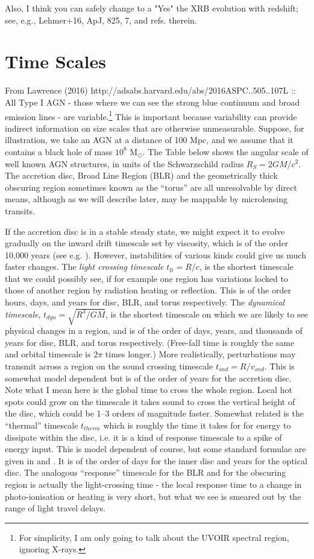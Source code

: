 \documentclass[11pt]{article}
\begin{document}
Also, I think you can safely change to a "Yes" the XRB evolution
with redshift; see, e.g., Lehmer+16, ApJ, 825, 7, and refs. therein.


\newpage
\section{Time Scales}
From Lawrence (2016) http://adsabs.harvard.edu/abs/2016ASPC..505..107L :: \\
All Type I AGN - those where we can see the strong blue continuum and
broad emission lines - are variable.\footnote{For simplicity, I am
only going to talk about the UVOIR spectral region, ignoring X-rays.}
This is important because variability can provide indirect information
on size scales that are otherwise unmeasurable. Suppose, for
illustration, we take an AGN at a distance of 100 Mpc, and we assume
that it contains a black hole of mass $10^8$ M$_\odot$. The Table
below shows the angular scale of well known AGN structures, in units
of the Schwarzschild radius $R_S=2GM/c^2$. The accretion disc, Broad
Line Region (BLR) and the geometrically thick obscuring region
sometimes known as the ``torus'' are all unresolvable by direct means,
although as we will describe later, may be mappable by microlensing
transits.

If the accretion disc is in a stable steady state, we might expect it
to evolve gradually on the inward drift timescale set by viscosity,
which is of the order 10,000 years (see
e.g. \citet{Netzer2013}). However, instabilities of various kinds
could give us much faster changes. The {\em light crossing timescale}
$t_{lt}=R/c$, is the shortest timescale that we could possibly see, if
for example one region has variations locked to those of another
region by radiation heating or reflection. This is of the order hours,
days, and years for disc, BLR, and torus respectively. The {\em
dynamical timescale}, $t_{dyn}=\sqrt{R^3/GM}$, is the shortest
timescale on which we are likely to see physical changes in a region,
and is of the order of days, years, and thousands of years for disc,
BLR, and torus respectively. (Free-fall time is roughly the same and
orbital timescale is $2\pi$ times longer.) More realistically,
perturbations may transmit across a region on the sound crossing
timescale $t_{snd}= R/ v_{snd}$. This is somewhat model dependent but
is of the order of years for the accretion disc. Note what I mean here
is the global time to cross the whole region. Local hot spots could
grow on the timescale it takes sound to cross the vertical height of
the disc, which could be 1--3 orders of magnitude faster. Somewhat
related is the ``thermal'' timescale $t_{therm}$ which is roughly the
time it takes for for energy to dissipate within the disc, i.e. it is
a kind of response timescale to a spike of energy input. This is model
dependent of course, but some standard formulae are given in
\citet{Collier2001a} and \citet{Kelly2009}. It is of the order of days
for the inner disc and years for the optical disc.  The analogous
``response'' timescale for the BLR and for the obscuring region is
actually the light-crossing time - the local response time to a change
in photo-ionisation or heating is very short, but what we see is
smeared out by the range of light travel delays.
\end{document}
